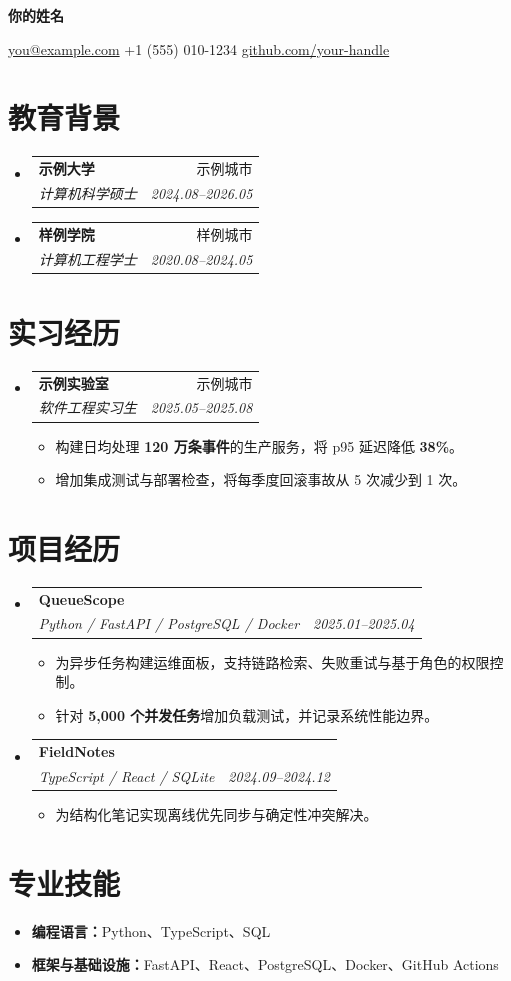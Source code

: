 \documentclass[a4paper,10pt]{article}
\makeatletter
\newcommand{\cnheading}[4]{
  \item\begin{tabularx}{\linewidth}{@{}Xr@{}}
  \textbf{#1} & #4 \\
  \textit{#2} & \textit{#3}
  \end{tabularx}\vspace{-3pt}
}
\newcommand{\cnitem}[1]{\item\small #1}
\makeatother
\begin{document}
\begin{center}
  {\LARGE\bfseries 你的姓名}\par\vspace{4pt}
  \small
  \href{mailto:you@example.com}{you@example.com}\quad\textbar\quad
  +1 (555) 010-1234\quad\textbar\quad
  \href{https://github.com/your-handle}{github.com/your-handle}
\end{center}

\section{教育背景}
\begin{itemize}[label={},leftmargin=0pt]
\cnheading{示例大学}{计算机科学硕士}{2024.08--2026.05}{示例城市}
\cnheading{样例学院}{计算机工程学士}{2020.08--2024.05}{样例城市}
\end{itemize}

\section{实习经历}
\begin{itemize}[label={},leftmargin=0pt]
\cnheading{示例实验室}{软件工程实习生}{2025.05--2025.08}{示例城市}
\begin{itemize}[leftmargin=1.3em]
\cnitem{构建日均处理 \textbf{120 万条事件}的生产服务，将 p95 延迟降低 \textbf{38\%}。}
\cnitem{增加集成测试与部署检查，将每季度回滚事故从 5 次减少到 1 次。}
\end{itemize}
\end{itemize}

\section{项目经历}
\begin{itemize}[label={},leftmargin=0pt]
\cnheading{QueueScope}{Python / FastAPI / PostgreSQL / Docker}{2025.01--2025.04}{}
\begin{itemize}[leftmargin=1.3em]
\cnitem{为异步任务构建运维面板，支持链路检索、失败重试与基于角色的权限控制。}
\cnitem{针对 \textbf{5,000 个并发任务}增加负载测试，并记录系统性能边界。}
\end{itemize}
\cnheading{FieldNotes}{TypeScript / React / SQLite}{2024.09--2024.12}{}
\begin{itemize}[leftmargin=1.3em]
\cnitem{为结构化笔记实现离线优先同步与确定性冲突解决。}
\end{itemize}
\end{itemize}

\section{专业技能}
\begin{itemize}[leftmargin=1.3em]
\cnitem{\textbf{编程语言：}Python、TypeScript、SQL}
\cnitem{\textbf{框架与基础设施：}FastAPI、React、PostgreSQL、Docker、GitHub Actions}
\end{itemize}
\end{document}
